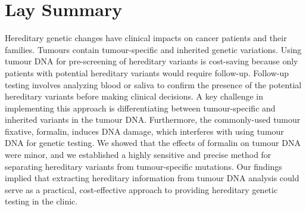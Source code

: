 
\chapter{Lay Summary}

Hereditary genetic changes have clinical impacts on cancer patients and their families. Tumours contain tumour-specific and inherited genetic variations. Using tumour DNA for pre-screening of hereditary variants is cost-saving because only patients with potential hereditary variants would require follow-up. Follow-up testing involves analyzing blood or saliva to confirm the presence of the potential hereditary variants before making clinical decisions. A key challenge in implementing this approach is differentiating between tumour-specific and inherited variants in the tumour DNA. Furthermore, the commonly-used tumour fixative, formalin, induces DNA damage, which interferes with using tumour DNA for genetic testing. We showed that the effects of formalin on tumour DNA were minor, and we established a highly sensitive and precise method for separating hereditary variants from tumour-specific mutations. Our findings implied that extracting hereditary information from tumour DNA analysis could serve as a practical, cost-effective approach to providing hereditary genetic testing in the clinic.
